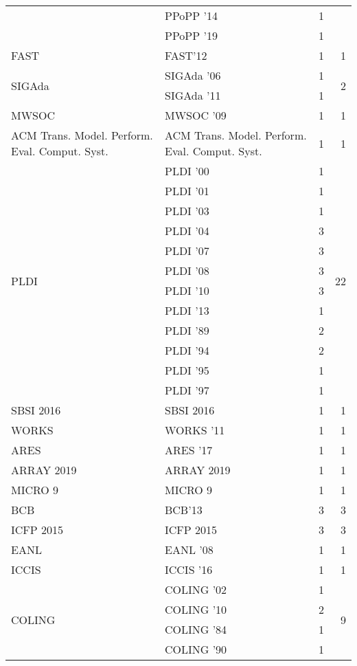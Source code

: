 \begin{table*}[t]
\begin{tabular}{llrr}
& PPoPP '14 & 1 &\\
& PPoPP '19 & 1 &\\
\multirow{1}{*}{FAST} & FAST'12 & 1 & \multirow{1}{*}{1}\\
\multirow{2}{*}{SIGAda } & SIGAda '06 & 1 & \multirow{2}{*}{2}\\
& SIGAda '11 & 1 &\\
\multirow{1}{*}{MWSOC } & MWSOC '09 & 1 & \multirow{1}{*}{1}\\
\multirow{1}{*}{ACM Trans. Model. Perform. Eval. Comput. Syst.} & ACM Trans. Model. Perform. Eval. Comput. Syst. & 1 & \multirow{1}{*}{1}\\
\multirow{12}{*}{PLDI } & PLDI '00 & 1 & \multirow{12}{*}{22}\\
& PLDI '01 & 1 &\\
& PLDI '03 & 1 &\\
& PLDI '04 & 3 &\\
& PLDI '07 & 3 &\\
& PLDI '08 & 3 &\\
& PLDI '10 & 3 &\\
& PLDI '13 & 1 &\\
& PLDI '89 & 2 &\\
& PLDI '94 & 2 &\\
& PLDI '95 & 1 &\\
& PLDI '97 & 1 &\\
\multirow{1}{*}{SBSI 2016} & SBSI 2016 & 1 & \multirow{1}{*}{1}\\
\multirow{1}{*}{WORKS } & WORKS '11 & 1 & \multirow{1}{*}{1}\\
\multirow{1}{*}{ARES } & ARES '17 & 1 & \multirow{1}{*}{1}\\
\multirow{1}{*}{ARRAY 2019} & ARRAY 2019 & 1 & \multirow{1}{*}{1}\\
\multirow{1}{*}{MICRO 9} & MICRO 9 & 1 & \multirow{1}{*}{1}\\
\multirow{1}{*}{BCB} & BCB'13 & 3 & \multirow{1}{*}{3}\\
\multirow{1}{*}{ICFP 2015} & ICFP 2015 & 3 & \multirow{1}{*}{3}\\
\multirow{1}{*}{EANL } & EANL '08 & 1 & \multirow{1}{*}{1}\\
\multirow{1}{*}{ICCIS } & ICCIS '16 & 1 & \multirow{1}{*}{1}\\
\multirow{8}{*}{COLING } & COLING '02 & 1 & \multirow{8}{*}{9}\\
& COLING '10 & 2 &\\
& COLING '84 & 1 &\\
& COLING '90 & 1 &\\

\end{tabular}
\end{table*}
